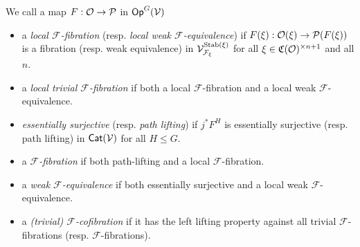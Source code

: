 \documentclass[a4paper,10pt
,draft
]{article}%
\renewcommand{\F}{\mathcal F}
\renewcommand{\1}{\ensuremath{\mathbb{id}}}
\begin{document}
\begin{definition}
      \label{MODEL_DEFN}
      We call a map $F: \mathcal{O} \to \mathcal{P}$ in $\mathsf{Op}^G(\mathcal V)$
      \begin{itemize}
      \item a {\em local $\F$-fibration} (resp. {\em local weak $\F$-equivalence}) if
            $F(\xi): \mathcal{O}(\xi)\to \mathcal{P}(F(\xi))$
            is a fibration (resp. weak equivalence) in $\V^{\Stab(\xi)}_{\F_\xi}$ for all $\xi\in \mathfrak C(\mathcal{O})^{\times n+1}$ and all $n$.
      \item a {\em local trivial $\F$-fibration} if both a local $\F$-fibration and a local weak $\F$-equivalence.
      \item {\em essentially surjective} (resp. {\em path lifting}) if $j^*F^H$ is essentially surjective (resp. path lifting) in $\mathsf{Cat}(\mathcal V)$ for all $H\leq G$.
      \item a {\em $\F$-fibration} if both path-lifting and a local $\F$-fibration.
      \item a {\em weak $\F$-equivalence} if both essentially surjective and a local weak $\F$-equivalence.
      \item a \textit{(trivial) $\F$-cofibration} if it has the left lifting property against all trivial $\F$-fibrations (resp. $\F$-fibrations).
      \end{itemize}
\end{definition}


\end{document}
